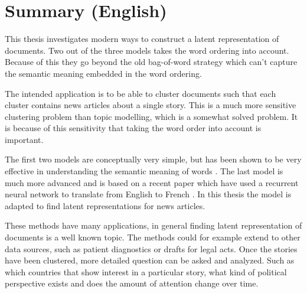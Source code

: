 \chapter{Summary (English)}

This thesis investigates modern ways to construct a latent representation of documents. Two out of the three models takes the word ordering into account. Because of this they go beyond the old bag-of-word strategy which can't capture the semantic meaning embedded in the word ordering. 

The intended application is to be able to cluster documents such that each cluster contains news articles about a single story. This is a much more sensitive clustering problem than topic modelling, which is a somewhat solved problem. It is because of this sensitivity that taking the word order into account is important.

The first two models are conceptually very simple, but has been shown to be very effective in understanding the semantic meaning of words \cite{word2vec-details, doc2vec}. The last model is much more advanced and is based on a recent paper which have used a recurrent neural network to translate from English to French \cite{sutskever}. In this thesis the model is adapted to find latent representations for news articles.

These methods have many applications, in general finding latent representation of documents is a well known topic. The methods could for example extend to other data sources, such as patient diagnostics or drafts for legal acts.
Once the stories have been clustered, more detailed question can be asked and analyzed. Such as which countries that show interest in a particular story, what kind of political perspective exists and does the amount of attention change over time.
